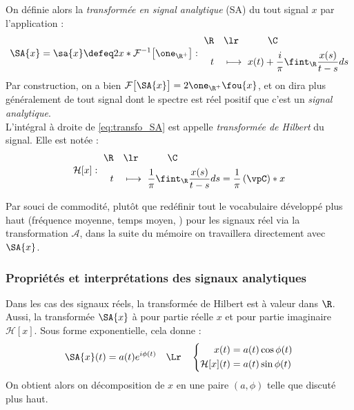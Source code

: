 \begin{definition}\label{def:transfo_sa&hilbert}
	On définie alors la \emph{transformée en signal analytique} (SA) du tout signal $x$ par l'application :
	\begin{equation}\label{eq:transfo_SA}
		\SA{x} = \sa{x} \defeq 2 x*\mathcal{F}^{-1}\big[\one_{\R^+}\big] :\ \begin{aligned} 
			\R \quad &\lr\qquad\quad \C \\	
			t\quad &\longmapsto\ x(t) + \frac{i}{\pi}\fint_\R \frac{x(s)}{t-s}ds
		\end{aligned}
	\end{equation}
	Par construction, on a bien $\mathcal{F}\big[\SA{x}\big] = 2\one_{\R^+}\fou{x}$, et on dira plus généralement de tout signal dont le spectre est réel positif que c'est un \emph{signal analytique}.
	\\
	L'intégral à droite de \eqref{eq:transfo_SA} est appelle \emph{transformée de Hilbert} du signal. Elle est notée :
	\begin{equation}\label{eq:transfo_Hilb}
		\mathcal{H}[x] :\ \begin{aligned} 
			\R \quad &\lr\qquad\quad \C \\	
			t\quad &\longmapsto\ \frac{1}{\pi}\fint_\R \frac{x(s)}{t-s}ds =  \frac{1}{\pi}\left(\vpC\right)*x
		\end{aligned}
	\end{equation}
\end{definition}

Par souci de commodité, plutôt que redéfinir tout le vocabulaire développé plus haut (fréquence moyenne, temps moyen, \etc) pour les signaux réel via la transformation $\mathcal{A}$, dans la suite du mémoire on travaillera directement avec $\SA{x}$. %




\subsubsection{Propriétés et interprétations des signaux analytiques}


Dans les cas des signaux réels, la transformée de Hilbert est à valeur dans $\R$. Aussi, la transformée $\SA{x}$ à pour partie réelle $x$ et pour partie imaginaire $\mathcal{H}[x]$. Sous forme exponentielle, cela donne :
\[\SA{x}(t) = a(t)e^{i\phi(t)}\quad \Lr\quad \left\{\begin{aligned}x(t) &= a(t) \cos\phi(t) \\\mathcal{H}[x](t) &= a(t) \sin\phi(t)
\end{aligned}\right.\]
On obtient alors on décomposition de $x$ en une paire $(a,\phi)$ telle que discuté plus haut.

